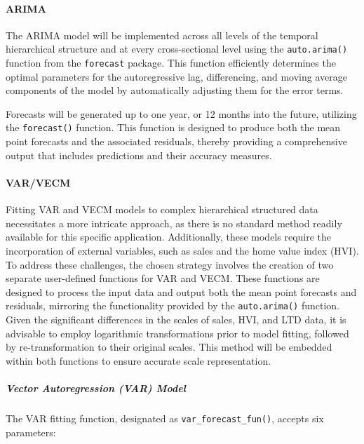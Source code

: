 \documentclass[11pt,a4paper,]{article}
\begin{document}
\paragraph{ARIMA}\label{arima}

The ARIMA model will be implemented across all levels of the temporal hierarchical structure and at every cross-sectional level using the \texttt{auto.arima()} function from the \texttt{forecast} package. This function efficiently determines the optimal parameters for the autoregressive lag, differencing, and moving average components of the model by automatically adjusting them for the error terms.

Forecasts will be generated up to one year, or 12 months into the future, utilizing the \texttt{forecast()} function. This function is designed to produce both the mean point forecasts and the associated residuals, thereby providing a comprehensive output that includes predictions and their accuracy measures.

\paragraph{VAR/VECM}\label{varvecm}

Fitting VAR and VECM models to complex hierarchical structured data necessitates a more intricate approach, as there is no standard method readily available for this specific application. Additionally, these models require the incorporation of external variables, such as sales and the home value index (HVI). To address these challenges, the chosen strategy involves the creation of two separate user-defined functions for VAR and VECM. These functions are designed to process the input data and output both the mean point forecasts and residuals, mirroring the functionality provided by the \texttt{auto.arima()} function. Given the significant differences in the scales of sales, HVI, and LTD data, it is advisable to employ logarithmic transformations prior to model fitting, followed by re-transformation to their original scales. This method will be embedded within both functions to ensure accurate scale representation.

\subparagraph{Vector Autoregression (VAR) Model}\label{vector-autoregression-var-model}

The VAR fitting function, designated as \texttt{var\_forecast\_fun()}, accepts six parameters:
\end{document}
